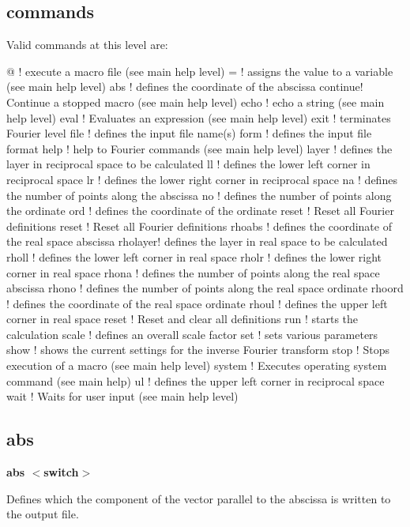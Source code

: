 \subsection*{commands}
Valid commands at this level are: 
\par
\begin{MacVerbatim}
@       ! execute a macro file (see main help level)
=       ! assigns the value to a variable (see main help level)
abs     ! defines the coordinate of the abscissa
continue! Continue a stopped macro (see main help level)
echo    ! echo a string (see main help level)
eval    ! Evaluates an expression (see main help level)
exit    ! terminates Fourier level
file    ! defines the input file name(s)
form    ! defines the input file format
help    ! help to Fourier commands (see main help level)
layer   ! defines the layer in reciprocal space to be calculated
ll      ! defines the lower left corner in reciprocal space
lr      ! defines the lower right corner in reciprocal space
na      ! defines the number of points along the abscissa
no      ! defines the number of points along the ordinate
ord     ! defines the coordinate of the ordinate
reset   ! Reset all Fourier definitions
reset   ! Reset all Fourier definitions
rhoabs  ! defines the coordinate of the real space abscissa
rholayer! defines the layer in real space to be calculated
rholl   ! defines the lower left corner in real space
rholr   ! defines the lower right corner in real space
rhona   ! defines the number of points along the real space abscissa
rhono   ! defines the number of points along the real space ordinate
rhoord  ! defines the coordinate of the real space ordinate
rhoul   ! defines the upper left corner in real space
reset   ! Reset and clear all definitions
run     ! starts the calculation
scale   ! defines an overall scale factor
set     ! sets various parameters
show    ! shows the current settings for the inverse Fourier transform
stop    ! Stops execution of a macro (see main help level)
system  ! Executes operating system command (see main help)
ul      ! defines the upper left corner in reciprocal space
wait    ! Waits for user input (see main help level)
\end{MacVerbatim}
\subsection*{abs}
{\bf abs $ <$switch$> $ \par }
\par
\vspace{3pt}
Defines which the component of the vector parallel to the abscissa 
is written to the output file. 
